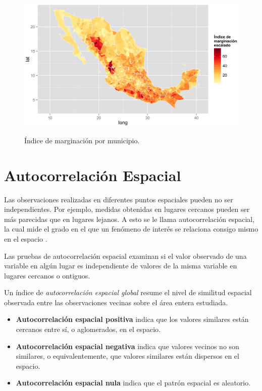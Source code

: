 \begin{itemize}
\begin{enumerate}
\begin{figure}[!ht]
\centering
\includegraphics[width=.9\textwidth]{./maps/mapmarg.png} \\
\caption{ Índice de marginación por municipio.}
\label{map_marg_ej}  
\end{figure}

\end{enumerate}

\end{itemize}


\chapter{Autocorrelación Espacial}

Las observaciones realizadas en diferentes puntos espaciales pueden no ser independientes. Por ejemplo, medidas obtenidas en lugares cercanos pueden ser más parecidas que en lugares lejanos. A esto se le llama autocorrelación espacial, la cual mide el grado en el que un fenómeno de interés se relaciona consigo mismo en el espacio \citep{clifford1973, clifford1981}.

Las pruebas de autocorrelación espacial examinan si el valor observado de una variable en algún lugar es independiente de valores de la misma variable en lugares cercanos o  ontiguos.

Un índice de \textit{autocorrelación espacial global} resume el nivel de similitud espacial observada entre las observaciones vecinas sobre el área entera estudiada.

\begin{itemize}
\item \textbf{Autocorrelación espacial positiva} indica que los valores similares están cercanos entre sí, o aglomerados, en el espacio.
\item \textbf{Autocorrelación espacial negativa} indica que valores vecinos no son similares, o equivalentemente, que valores similares están dispersos en el espacio.
\item \textbf{Autocorrelación espacial nula} indica que el patrón espacial es aleatorio.
\end{itemize}

